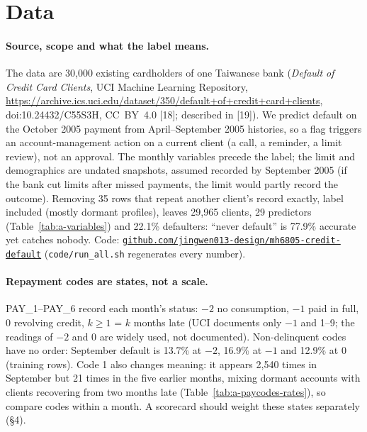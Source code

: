 \section{Data}

\paragraph{Source, scope and what the label means.}
The data are 30,000 existing cardholders of one Taiwanese bank (\emph{Default of Credit Card Clients}, UCI Machine Learning Repository, \url{https://archive.ics.uci.edu/dataset/350/default+of+credit+card+clients}, doi:10.24432/C55S3H, CC~BY~4.0 [18]; described in [19]). We predict default on the October 2005 payment from April--September 2005 histories, so a flag triggers an account-management action on a current client (a call, a reminder, a limit review), not an approval. The monthly variables precede the label; the limit and demographics are undated snapshots, assumed recorded by September 2005 (if the bank cut limits after missed payments, the limit would partly record the outcome). Removing 35 rows that repeat another client's record exactly, label included (mostly dormant profiles), leaves 29,965 clients, 29 predictors (Table~\ref{tab:a-variables}) and 22.1\% defaulters: ``never default'' is 77.9\% accurate yet catches nobody. Code: \href{https://github.com/jingwen013-design/mh6805-credit-default}{\texttt{github.com/jingwen013-design/mh6805-credit-default}} (\texttt{code/run\_all.sh} regenerates every number).

\paragraph{Repayment codes are states, not a scale.}
PAY\_1--PAY\_6 record each month's status: $-2$ no consumption, $-1$ paid in full, 0 revolving credit, $k \ge 1$ = $k$ months late (UCI documents only $-1$ and 1--9; the readings of $-2$ and 0 are widely used, not documented). Non-delinquent codes have no order: September default is 13.7\% at $-2$, 16.9\% at $-1$ and 12.9\% at 0 (training rows). Code 1 also changes meaning: it appears 2,540 times in September but 21 times in the five earlier months, mixing dormant accounts with clients recovering from two months late (Table~\ref{tab:a-paycodes-rates}), so compare codes within a month. A scorecard should weight these states separately (\S4).

